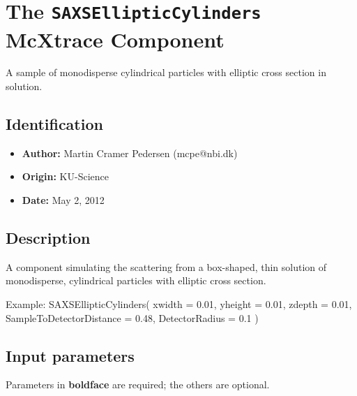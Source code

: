 \section{The \texttt{SAXSEllipticCylinders} McXtrace Component}
A sample of monodisperse cylindrical particles with elliptic cross section in
solution.

\subsection*{Identification}
\begin{itemize}
  \item \textbf{Author:} Martin Cramer Pedersen (mcpe@nbi.dk)
  \item \textbf{Origin:} KU-Science
  \item \textbf{Date:} May 2, 2012
\end{itemize}

\subsection*{Description}
A component simulating the scattering from a box-shaped, thin solution of monodisperse, cylindrical particles with elliptic cross section.

Example: SAXSEllipticCylinders( xwidth = 0.01, yheight = 0.01, zdepth = 0.01, SampleToDetectorDistance = 0.48, DetectorRadius = 0.1 )

\subsection*{Input parameters}
Parameters in \textbf{boldface} are required; the others are optional.

